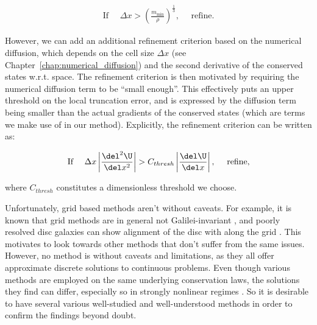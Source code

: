 \begin{align}
\text{If } \quad \Delta x > \left(\frac{m_{\min}}{\rho}\right)^{\frac{1}{3}}, \quad \text{ refine.}
\end{align}

However, we can add an additional refinement criterion based on the numerical diffusion, which
depends on the cell size $\Delta x$ (see Chapter~\ref{chap:numerical_diffusion}) and the second
derivative of the conserved states w.r.t. space. The refinement criterion is then motivated by
requiring the numerical diffusion term to be ``small enough''. This effectively puts an upper
threshold on the local truncation error, and is expressed by the diffusion term being smaller than
the actual gradients of the conserved states (which are terms we make use of in our method).
Explicitly, the refinement criterion can be written as:

\begin{align}
\text{If } \quad \Delta x \left| \frac{\del^2 \U}{\del x^2} \right| > C_{thresh}
\left|\frac{\del \U}{\del x} \right|, \quad \text{ refine,}
\end{align}

where $C_{thresh}$ constitutes a dimensionless threshold we choose.

Unfortunately, grid based methods aren't without caveats. For example, it is known that grid
methods are in general not Galilei-invariant \citep[e.g.][]{wadsleyTreatmentEntropyMixing2008}, and
poorly resolved disc galaxies can show alignment of the disc with along the grid
\citep[e.g.][]{hahnLargescaleOrientationsDisc2010}. This motivates to look towards other methods
that don't suffer from the same issues. However, no method is without caveats and limitations, as
they all offer approximate discrete solutions to continuous problems. Even though various methods
are employed on the same underlying conservation laws, the solutions they find can differ,
especially so in strongly nonlinear regimes \citep[e.g.][For an example of difference in results
of two different methods on the same problem in this work, see Figures~\ref{fig:kelvin-helmholtz-1}
and~\ref{fig:kelvin-helmholtz-2} ]{frenkSantaBarbaraCluster1999,
agertzFundamentalDifferencesSPH2007a, braspenningSensitivityNonradiativeCloudwind2022a}. So it is
desirable to have several various well-studied and well-understood methods in order to confirm
the findings beyond doubt.

